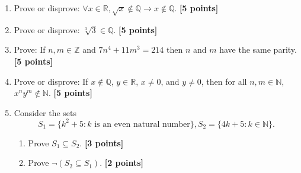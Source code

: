 \documentclass{article}
\begin{document}
\begin{enumerate}
 \item Prove or disprove:  $\forall x \in \mathbb{R}, \sqrt{x} \notin \mathbb{Q} \rightarrow x \notin \mathbb{Q} $.   \textbf{[5 points]}

\item Prove or disprove: $ \sqrt[3]{3} \in \mathbb{Q}$.  \textbf{[5 points]} %

\item Prove:  If $n, m \in \mathbb{Z}$ and $7 n^4 + 11 m^3 = 214$ then $n$ and $m$ have the same parity.  \textbf{[5 points]}

\item Prove or disprove: If $x \notin \mathbb{Q}$, $y \in \mathbb{R}$, $x \neq 0$, and $y \neq 0$, then for all $n, m \in \mathbb{N}$,  $x^ny^m
\notin \mathbb{N}$.  \textbf{[5 points]}

\item Consider the sets 
\[ S_1 = \{k^2+5: k \mbox{ is an even natural number} \},   S_2 = \{4k+5: k \in \mathbb{N} \}.    \]
\begin{enumerate}
	\item Prove $S_1 \subseteq S_2$. \textbf{[3 points]}
	\item Prove $\neg (S_2 \subseteq S_1)$. \textbf{[2 points]}
\end{enumerate}
\end{enumerate}
\end{document}
